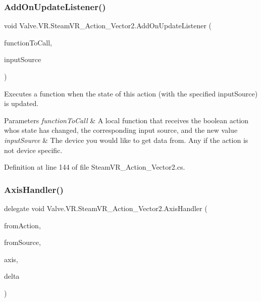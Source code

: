\subsubsection{\texorpdfstring{AddOnUpdateListener()}{AddOnUpdateListener()}}
{\footnotesize\ttfamily void Valve.\+V\+R.\+Steam\+V\+R\+\_\+\+Action\+\_\+\+Vector2.\+Add\+On\+Update\+Listener (\begin{DoxyParamCaption}\item[{\mbox{\hyperlink{class_valve_1_1_v_r_1_1_steam_v_r___action___vector2_a3f6872fd8960cbb9f571b0362857d9b5}{Update\+Handler}}}]{function\+To\+Call,  }\item[{\mbox{\hyperlink{namespace_valve_1_1_v_r_a82e5bf501cc3aa155444ee3f0662853f}{Steam\+V\+R\+\_\+\+Input\+\_\+\+Sources}}}]{input\+Source }\end{DoxyParamCaption})}



Executes a function when the state of this action (with the specified input\+Source) is updated. 


\begin{DoxyParams}{Parameters}
{\em function\+To\+Call} & A local function that receives the boolean action who\textquotesingle{}s state has changed, the corresponding input source, and the new value\\
\hline
{\em input\+Source} & The device you would like to get data from. Any if the action is not device specific.\\
\hline
\end{DoxyParams}


Definition at line 144 of file Steam\+V\+R\+\_\+\+Action\+\_\+\+Vector2.\+cs.

\mbox{\label{class_valve_1_1_v_r_1_1_steam_v_r___action___vector2_a11d8b99df804d185a33c7c60791ef426}} 
\subsubsection{\texorpdfstring{AxisHandler()}{AxisHandler()}}
{\footnotesize\ttfamily delegate void Valve.\+V\+R.\+Steam\+V\+R\+\_\+\+Action\+\_\+\+Vector2.\+Axis\+Handler (\begin{DoxyParamCaption}\item[{\mbox{\hyperlink{class_valve_1_1_v_r_1_1_steam_v_r___action___vector2}{Steam\+V\+R\+\_\+\+Action\+\_\+\+Vector2}}}]{from\+Action,  }\item[{\mbox{\hyperlink{namespace_valve_1_1_v_r_a82e5bf501cc3aa155444ee3f0662853f}{Steam\+V\+R\+\_\+\+Input\+\_\+\+Sources}}}]{from\+Source,  }\item[{Vector2}]{axis,  }\item[{Vector2}]{delta }\end{DoxyParamCaption})}

